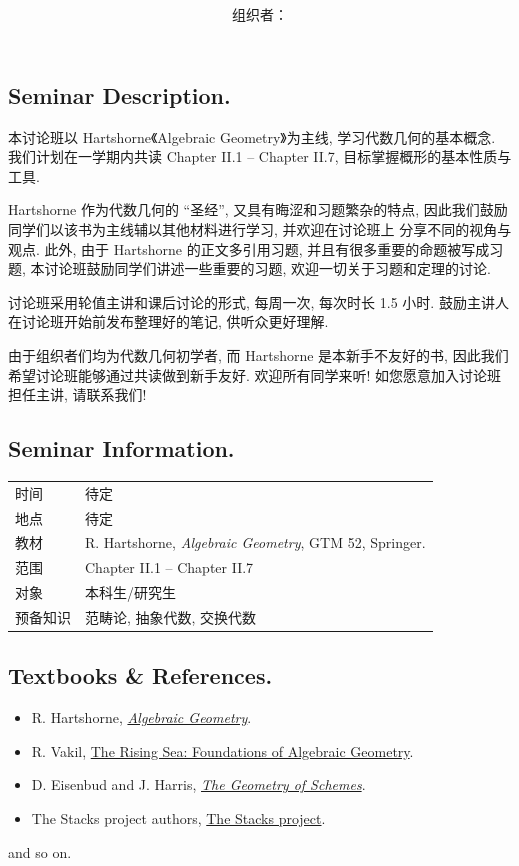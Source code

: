 \documentclass[11pt,a4paper]{ctexart}
\title{\textbf{\seminartitle}}
\author{组织者：\organizer \\ \texttt{\seminaremail}}
\date{\seminarterm}
\newcommand{\seminartime}{待定}
\newcommand{\seminarlocation}{待定}
\newcommand{\seminartext}{R. Hartshorne, \emph{Algebraic Geometry}, GTM 52, Springer.}
\begin{document}
\maketitle

\subsection*{Seminar Description.}
本讨论班以 Hartshorne《Algebraic Geometry》为主线, 
学习代数几何的基本概念. 我们计划在一学期内共读 
Chapter II.1 -- Chapter II.7, 目标掌握概形的基本性质与工具. 

Hartshorne 作为代数几何的 ``圣经'', 又具有晦涩和习题繁杂的特点, 
因此我们鼓励同学们以该书为主线辅以其他材料进行学习, 并欢迎在讨论班上
分享不同的视角与观点. 此外, 由于 Hartshorne 的正文多引用习题, 
并且有很多重要的命题被写成习题, 本讨论班鼓励同学们讲述一些重要的习题, 
欢迎一切关于习题和定理的讨论. 

讨论班采用轮值主讲和课后讨论的形式, 每周一次, 每次时长 1.5 小时. 
鼓励主讲人在讨论班开始前发布整理好的笔记, 供听众更好理解. 

由于组织者们均为代数几何初学者, 而 Hartshorne 是本新手不友好的书, 
因此我们希望讨论班能够通过共读做到新手友好. 欢迎所有同学来听! 
如您愿意加入讨论班担任主讲, 请联系我们! 

\subsection*{Seminar Information.}

\begin{tabular}{@{}p{3cm}p{11cm}@{}}
\toprule
时间 & \seminartime \\
地点 & \seminarlocation \\
教材 & \seminartext \\
范围 & Chapter II.1 -- Chapter II.7 \\
对象 & 本科生/研究生 \\
预备知识 & 范畴论, 抽象代数, 交换代数 \\
\bottomrule
\end{tabular}

\subsection*{Textbooks \& References.}
\begin{itemize}
    \item R. Hartshorne, \href{https://link.springer.com/book/10.1007/978-1-4757-3849-0}{\emph{Algebraic Geometry}}. 
    \item R. Vakil, \href{https://math.stanford.edu/~vakil/216blog/FOAGjul2724public.pdf}{The Rising Sea: Foundations of Algebraic Geometry}.
    \item D. Eisenbud and J. Harris, \href{https://link.springer.com/book/10.1007/b97680}{\emph{The Geometry of Schemes}}. 
    \item The Stacks project authors, \href{https://stacks.math.columbia.edu/}{The Stacks project}.
\end{itemize}
\hspace{3em} and so on. 
\end{document}
